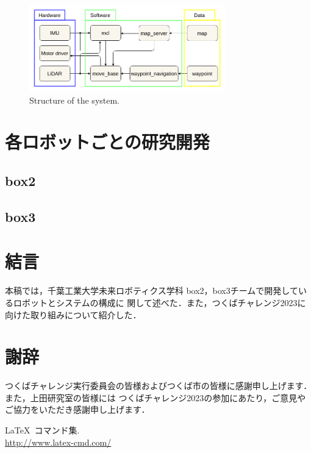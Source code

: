 \documentclass[twocolumn, 9pt]{jsproceedings}
\begin{document}
\begin{figure}[h]
  \centering
  \includegraphics[width=85mm]{fig/software.pdf}
  \caption{Structure of the system.}
  \label{fig:soft-fig}%
\end{figure}


\section{各ロボットごとの研究開発}
\subsection{box2}
\subsection{box3}

\section{結言}
本稿では，千葉工業大学未来ロボティクス学科 box2，box3チームで開発しているロボットとシステムの構成に
関して述べた．また，つくばチャレンジ2023に向けた取り組みについて紹介した．

\section*{謝辞}
つくばチャレンジ実行委員会の皆様およびつくば市の皆様に感謝申し上げます．また，上田研究室の皆様には
つくばチャレンジ2023の参加にあたり，ご意見やご協力をいただき感謝申し上げます．


\footnotesize
\begin{thebibliography}{99}
\LaTeX~コマンド集.\\
\url{http://www.latex-cmd.com/}


\end{thebibliography}
\normalsize
\end{document}
